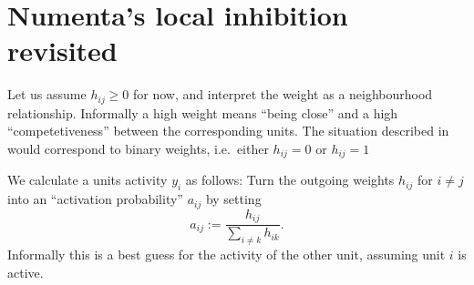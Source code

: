 \documentclass[titlepage]{amsart}
\theoremstyle{definition}
\begin{document}
% 
% 
\section{Numenta's local inhibition revisited}
% 
% 
% 
Let us assume $h_{ij} \geq 0$ for now, and interpret 
the weight as a neighbourhood relationship. Informally a high weight
means ``being close'' and a high ``competetiveness'' between the corresponding units.
The situation described in \cite{sp_paper} would correspond to binary weights, 
i.e.\ either $h_{ij} = 0$ or $h_{ij} = 1$

We calculate a units activity $y_i$ as follows:
Turn the outgoing weights $h_{ij}$ for $i \neq j$ into 
an ``activation probability'' $a_{ij}$ by setting
\[
      a_{ij} := \frac{h_{ij}}{\mathop{\sum}\limits_{i \neq k} h_{ik} }.
\]
Informally this is a best guess for the activity of the other unit, assuming
unit $i$ is active.
\end{document}
